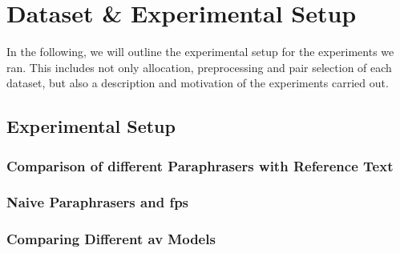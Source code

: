 \chapter{Dataset \& Experimental Setup}
\label{chap:dataset_experimental_setup}

In the following, we will outline the experimental setup for the experiments we ran.
This includes not only allocation, preprocessing and pair selection of each dataset, but also a description and motivation of the experiments carried out.




\section{Experimental Setup}
\label{sec:experimental_setup}





\subsection{Comparison of different Paraphrasers with Reference Text}



\subsection{Naive Paraphrasers and \acp{fp}}



\subsection{Comparing Different \ac{av} Models}





